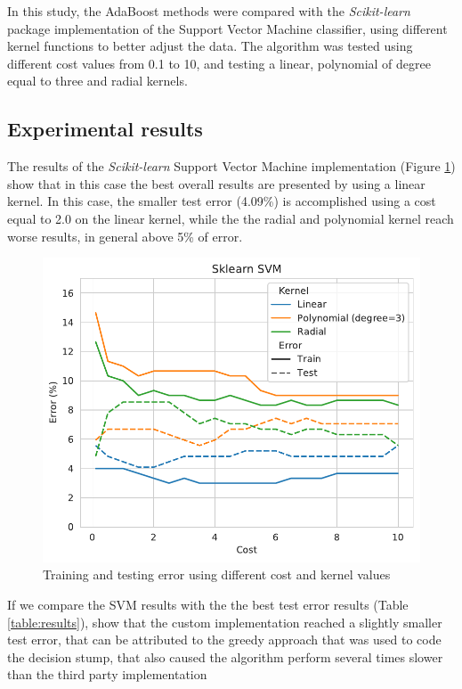 \documentclass[11pt,twocolumn,letterpaper]{article}
\begin{document}
In this study, the AdaBoost methods were compared with the \textit{Scikit-learn} package implementation of the Support Vector Machine classifier, using different kernel functions to better adjust the data. The algorithm was tested using different cost values from 0.1 to 10, and testing a linear, polynomial of degree equal to three and radial kernels.

\subsection{Experimental results}

The results of the \textit{Scikit-learn} Support Vector Machine implementation (Figure \ref{fig:svm}) show that in this case the best overall results are presented by using a linear kernel. In this case, the smaller test error (4.09\%) is accomplished using a cost equal to 2.0 on the linear kernel, while the the radial and polynomial kernel reach worse results, in general above 5\% of error.

\begin{figure}[h]
	\begin{center}
		\includegraphics[width=1.0\linewidth]{cost_kernel_svm.pdf}
	\end{center}
	\caption{Training and testing error using different cost and kernel values}
	\label{fig:svm}
\end{figure}

If we compare the SVM results with the the best test error results (Table \ref{table:results}), show that the custom implementation reached a slightly smaller test error, that can be attributed to the greedy approach that was used to code the decision stump, that also caused the algorithm perform several times slower than the third party implementation
\end{document}
